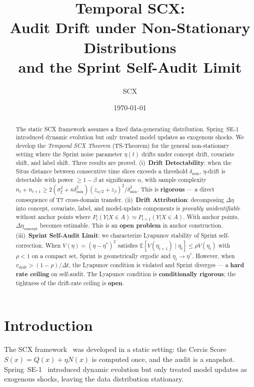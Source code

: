 \documentclass[12pt,a4paper]{article}
\title{\bfseries Temporal SCX:\\
Audit Drift under Non-Stationary Distributions\\
and the Sprint Self-Audit Limit}
\author{SCX}
\date{\today}
\newcommand{\E}{\mathbb{E}}
\begin{document}
\maketitle

\begin{abstract}
The static \textsf{SCX} framework assumes a fixed data-generating distribution.
Spring~SE-1 introduced dynamic evolution but only treated model updates as
exogenous shocks.  We develop the \emph{Temporal SCX Theorem} (TS-Theorem)
for the general non-stationary setting where the Sprint noise parameter
$\eta(t)$ drifts under concept drift, covariate shift, and label shift.
Three results are proved.  (i)~\textbf{Drift Detectability}: when the Situs
distance between consecutive time slices exceeds a threshold $\delta_{\min}$,
$\eta$-drift is detectable with power $\geq 1-\beta$ at significance
$\alpha$, with sample complexity
$n_t + n_{t+1} \geq 2(\sigma^2_\xi + \kappa\delta^2_{\min})
(z_{\alpha/2} + z_\beta)^2 / \delta^2_{\min}$.  This is \textbf{rigorous}
--- a direct consequence of T7 cross-domain transfer.  (ii)~\textbf{Drift
Attribution}: decomposing $\Delta\eta$ into concept, covariate, label, and
model-update components is \emph{provably unidentifiable} without anchor
points where $P_t(Y|X \in A) \approx P_{t+1}(Y|X \in A)$.  With anchor
points, $\Delta\eta_{\mathrm{concept}}$ becomes estimable.  This is an
\textbf{open problem} in anchor construction.  (iii)~\textbf{Sprint
Self-Audit Limit}: we characterize Lyapunov stability of Sprint
self-correction.  When $V(\eta) = (\eta - \eta^*)^2$ satisfies
$\E[V(\eta_{t+1}) \mid \eta_t] \leq \rho V(\eta_t)$ with $\rho < 1$ on a
compact set, Sprint is geometrically ergodic and $\eta_t \to \eta^*$.
However, when $v_{\mathrm{drift}} > (1-\rho)/\Delta t$, the Lyapunov
condition is violated and Sprint diverges --- a \textbf{hard rate ceiling}
on self-audit.  The Lyapunov condition is \textbf{conditionally rigorous};
the tightness of the drift-rate ceiling is \textbf{open}.
\end{abstract}

\section{Introduction}

The \textsf{SCX} framework~\citep{scx2024cercis} was developed in a static setting:
the Cercis Score $S(x) = Q(x) + \eta N(x)$ is computed once, and the audit
is a snapshot.  Spring~SE-1~\citep{scx2024spring} introduced dynamic
evolution but only treated model updates as exogenous shocks, leaving the
data distribution stationary.
\end{document}
